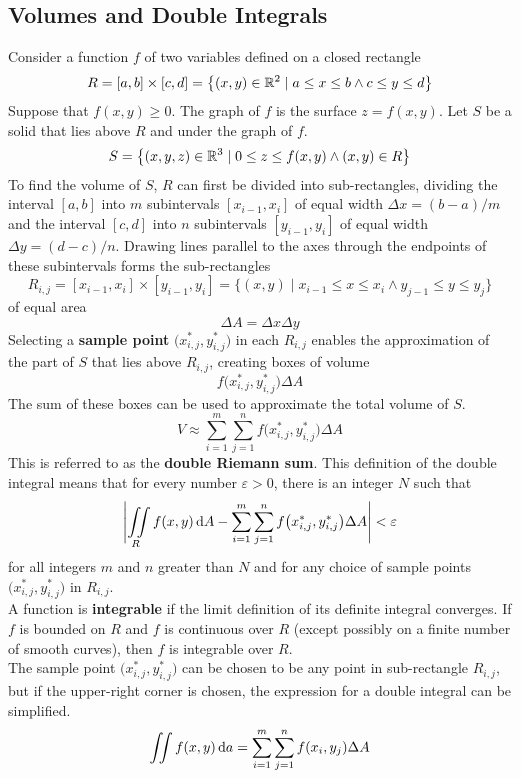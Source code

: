 \documentclass[../Calculus \Roman{3}.tex]{subfiles}
\begin{document}
		\subsection*{Volumes and Double Integrals}
			Consider a function $f$ of two variables defined on a closed rectangle
				\[R = [a, b] \times [c, d] = \left\{(x, y) \in \mathbb{R}^2 \mid a \le x \le b \land c \le y \le d\right\}\]
				Suppose that $f(x, y) \ge 0$. The graph of $f$ is the surface $z = f(x, y)$. Let $S$ be a solid that lies above $R$ and under the graph of $f$.
					\[S = \left\{(x, y, z) \in \mathbb{R}^3 \mid 0 \le z \le f(x, y) \land (x, y) \in R\right\}\]
				To find the volume of $S$, $R$ can first be divided into sub-rectangles, dividing the interval $[a, b]$ into $m$ subintervals $[x_{i - 1}, x_i]$ of equal width $\Delta x = (b - a)/m$ and the interval $[c, d]$ into $n$ subintervals $[y_{i - 1}, y_i]$ of equal width $\Delta y = (d - c)/n$. Drawing lines parallel to the axes through the endpoints of these subintervals forms the sub-rectangles
					\[R_{i,j} = [x_{i - 1}, x_i] \times [y_{i - 1}, y_i] = \{(x, y) \mid x_{i - 1} \le x \le x_i \land y_{j - 1} \le y \le y_j\}\]
					of equal area
						\[\Delta A = \Delta x\Delta y\]
				Selecting a \textbf{sample point} $\bigl(x_{i, j}^*, y_{i, j}^*\bigr)$ in each $R_{i, j}$ enables the approximation of the part of $S$ that lies above $R_{i, j}$, creating boxes of volume
					\[f\bigl(x_{i, j}^*, y_{i, j}^*\bigr)\Delta A\]
				The sum of these boxes can be used to approximate the total volume of $S$.
					\[V \approx \sum_{i = 1}^m\sum_{j = 1}^n f\bigl(x_{i, j}^*, y_{i, j}^*\bigr)\Delta A\]
					This is referred to as the \textbf{double Riemann sum}.
			This definition of the double integral means that for every number $\varepsilon > 0$, there is an integer $N$ such that
				\[\Biggl|\iint\limits_R f(x, y)\,\mathrm{d} A - \sum_{i = 1}^m\sum_{j = 1}^n f\bigl(x_{i, j}^*, y_{i, j}^*\bigr)\Delta A\Biggr| < \varepsilon\]
				for all integers $m$ and $n$ greater than $N$ and for any choice of sample points $\bigl(x_{i, j}^*, y_{i, j}^*\bigr)$ in $R_{i, j}$. \\
			A function is \textbf{integrable} if the limit definition of its definite integral converges. If $f$ is bounded on $R$ and $f$ is continuous over $R$ (except possibly on a finite number of smooth curves), then $f$ is integrable over $R$. \\
			The sample point $\bigl(x_{i, j}^*, y_{i, j}^*\bigr)$ can be chosen to be any point in sub-rectangle $R_{i, j}$, but if the upper-right corner is chosen, the expression for a double integral can be simplified.
				\[\iint f(x, y)\,\mathrm{d} a = \sum_{i = 1}^m\sum_{j = 1}^n f(x_i, y_j) \Delta A\]
\end{document}
